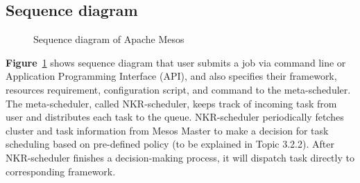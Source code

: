 \documentclass[12pt,oneside,openright,a4paper]{cpe-english-project}
\begin{document}
\subsection{Sequence diagram} 
\begin{figure}[!h]\centering
  \setlength{\fboxrule}{0mm} %
  \setlength{\fboxsep}{0cm}
  \caption{Sequence diagram of Apache Mesos}\label{fig:SequenceDiagram}
\end{figure}

\hspace{10mm}\textbf{Figure}~\ref{fig:SequenceDiagram} shows sequence diagram that user submits a job via command line or Application Programming Interface (API), and also specifies their framework, resources requirement, configuration script, and command to the meta-scheduler. The meta-scheduler, called NKR-scheduler, keeps track of incoming task from user and distributes each task to the queue. NKR-scheduler periodically fetches cluster and task information from Mesos Master to make a decision for task scheduling based on pre-defined policy (to be explained in Topic 3.2.2).  After NKR-scheduler finishes a decision-making process, it will dispatch task directly to corresponding framework.

\end{document}
